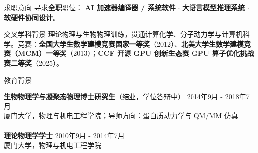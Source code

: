 \documentclass{resume} %
\begin{document}

\begin{rSection}{求职意向}
{寻求{\bf 全职}职位：
{\bf AI 加速器编译器 / 系统软件} $\cdot$
{\bf 大语言模型推理系统} $\cdot$
{\bf 软硬件协同设计}。}
\end{rSection}

\begin{rSection}{交叉学科背景}
{理论物理与生物物理训练，贯通计算化学、分子动力学与计算机科学。竞赛：{\bf 全国大学生数学建模竞赛国家一等奖}（2012）、{\bf 北美大学生数学建模竞赛（MCM）一等奖}（2013）；{\bf CCF 开源 GPU 创新生态赛 GPU 算子优化挑战赛二等奖}（2025）。}
\end{rSection}


\begin{rSection}{教育背景}

{\bf 生物物理学与凝聚态物理博士研究生}（结业，学位答辩中） \hfill {2014年9月 - 2018年7月 }\\ 
厦门大学，物理与机电工程学院；导师方向：蛋白质动力学与 QM/MM 仿真
\\
\\
{\bf 理论物理学学士} \hfill {2010年9月 - 2014年7月}\\
厦门大学，物理与机电工程学院

\end{rSection}


\end{document}
